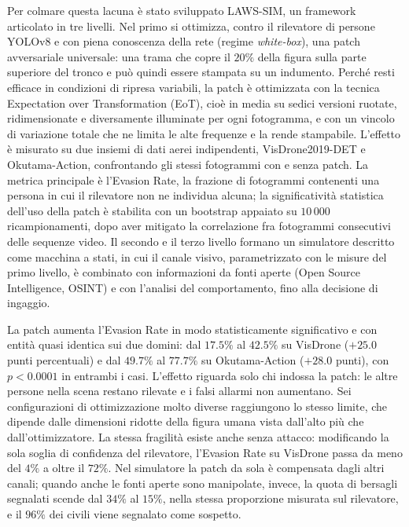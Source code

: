 \documentclass[a4paper,12pt]{report}
\begin{document}
Per colmare questa lacuna è stato sviluppato LAWS-SIM, un framework articolato
in tre livelli. Nel primo si ottimizza, contro il rilevatore di persone YOLOv8
e con piena conoscenza della rete (regime \emph{white-box}), una patch
avversariale universale: una trama che copre il $20\%$ della figura sulla parte
superiore del tronco e può quindi essere stampata su un indumento. Perché
resti efficace in condizioni di ripresa variabili, la patch è ottimizzata con
la tecnica Expectation over Transformation (EoT), cioè in media su sedici
versioni ruotate, ridimensionate e diversamente illuminate per ogni
fotogramma, e con un vincolo di variazione totale che ne limita le alte
frequenze e la rende stampabile. L'effetto è misurato su due insiemi di dati
aerei indipendenti, VisDrone2019-DET e Okutama-Action, confrontando gli stessi
fotogrammi con e senza patch. La metrica principale è l'Evasion Rate, la
frazione di fotogrammi contenenti una persona in cui il rilevatore non ne
individua alcuna; la significatività statistica dell'uso della patch è stabilita con un
bootstrap appaiato su
$10\,000$ ricampionamenti, dopo aver mitigato la correlazione fra fotogrammi
consecutivi delle sequenze video. Il secondo e il terzo livello formano un
simulatore descritto come macchina a stati, in cui il canale visivo,
parametrizzato con le misure del primo livello, è combinato con informazioni da
fonti aperte (Open Source Intelligence, OSINT) e con l'analisi del
comportamento, fino alla decisione di ingaggio.

La patch aumenta l'Evasion Rate in modo statisticamente significativo e con
entità quasi identica sui due domini: dal $17.5\%$ al $42.5\%$ su VisDrone
($+25.0$ punti percentuali) e dal $49.7\%$ al $77.7\%$ su Okutama-Action
($+28.0$ punti), con $p < 0.0001$ in entrambi i casi. L'effetto riguarda solo
chi indossa la patch: le altre persone nella scena restano rilevate e i falsi
allarmi non aumentano. Sei configurazioni di ottimizzazione molto diverse
raggiungono lo stesso limite, che dipende dalle dimensioni ridotte della figura
umana vista dall'alto più che dall'ottimizzatore. La stessa fragilità esiste
anche senza attacco: modificando la sola soglia di confidenza del rilevatore,
l'Evasion Rate su VisDrone passa da meno del $4\%$ a oltre il $72\%$. Nel
simulatore la patch da sola è compensata dagli altri canali; quando anche le
fonti aperte sono manipolate, invece, la quota di bersagli segnalati scende dal
$34\%$ al $15\%$, nella stessa proporzione misurata sul rilevatore, e il $96\%$
dei civili viene segnalato come sospetto.
\end{document}
